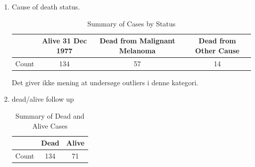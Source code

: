 \begin{enumerate}
\item Cause of death status. \newline
\begin{table}[h]
    \centering
    \begin{tabular}{|l|c|c|c|}
        \hline
        & Alive 31 Dec 1977 & Dead from Malignant Melanoma & Dead from Other Cause \\
        \hline
        Count & 134 & 57 & 14 \\
        \hline
    \end{tabular}
    \caption{Summary of Cases by Status}
    \label{tab:summary}
\end{table}
Det giver ikke mening at undersøge outliers i denne kategori. \newline
\item dead/alive follow up\\
\begin{table}[h!]
    \centering
    \begin{tabular}{|l|c|c|}
        \hline
        & Dead & Alive \\
        \hline
        Count & 134 & 71 \\
        \hline
    \end{tabular}
    \caption{Summary of Dead and Alive Cases}
    \label{tab:dead_alive}
\end{table}



\end{enumerate}
